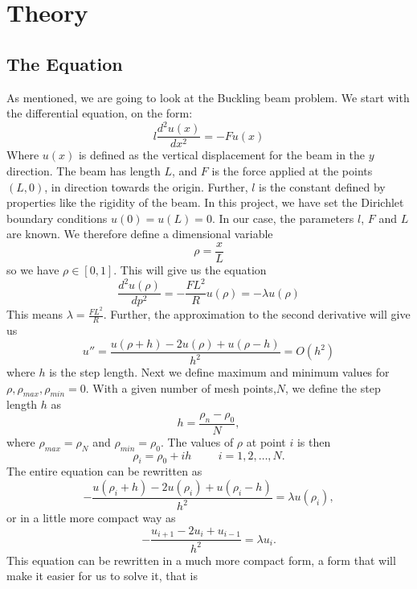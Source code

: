 \documentclass{article}
\begin{document}
\section{Theory}
\subsection{The Equation}

As mentioned, we are going to look at the Buckling beam problem. We start with the differential equation, on the form:
$$l\frac{d^2u(x)}{dx^2} = -Fu(x)$$
Where $u(x)$ is defined as the vertical displacement for the beam in the $y$ direction. The beam has length $L$, and $F$ is the force applied at the points $(L,0)$, in direction towards the origin. Further, $l$ is the constant defined by properties like the rigidity of the beam. In this project, we have set the Dirichlet boundary conditions $u(0)=u(L)=0$. In our case, the parameters $l$, $F$ and $L$ are known. We therefore define a dimensional variable $$\rho=\frac{x}{L}$$ so we have $\rho \in [0,1]$. This will give us the equation $$\frac{d^2u(\rho)}{dp^2}=-\frac{FL^2}{R}u(\rho)=-\lambda u(\rho)$$ This means $\lambda =\frac{FL^2}{R}$. Further, the approximation to the second derivative will give us
\begin{equation}
u''=\frac{u(\rho +h)-2u(\rho)+u(\rho -h)}{h^2}=O(h^2)
\end{equation}
where $h$ is the step length. Next we define maximum and minimum values for $\rho, \rho_{max}, \rho_{min} =0$. With a given number of mesh points,$N$, we define the step length $h$ as $$h=\frac{\rho_n-\rho_0}{N},$$ where $\rho_{max}=\rho_N$ and $\rho_{min}=\rho_0$. The values of $\rho$ at point $i$ is then $$\rho_i=\rho_0+ih \hspace{1cm}i=1,2,\dots,N.$$ The entire equation can be rewritten as $$
-\frac{u(\rho_i+h) -2u(\rho_i) +u(\rho_i-h)}{h^2}  = \lambda u(\rho_i),$$ or in a little more compact way as $$-\frac{u_{i+1} -2u_i +u_{i-1} }{h^2}  = \lambda u_i.$$ This equation can be rewritten in a much more compact form, a form that will make it easier for us to solve it, that is
\end{document}
